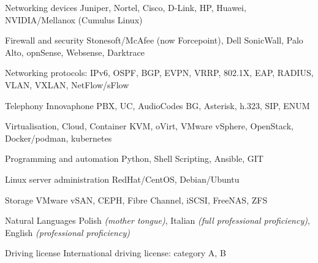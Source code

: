 


\begin{cvskills}


\cvskill
{Networking devices} %
{Juniper, Nortel, Cisco, D-Link, HP, Huawei, NVIDIA/Mellanox (Cumulus Linux)} %


\cvskill
{Firewall and security} %
{Stonesoft/McAfee (now Forcepoint), Dell SonicWall, Palo Alto, opnSense, Websense, Darktrace} %

\cvskill
{Networking protocols:} %
{IPv6, OSPF, BGP, EVPN, VRRP, 802.1X, EAP, RADIUS, VLAN, VXLAN, NetFlow/sFlow} %


\cvskill
{Telephony} %
{Innovaphone PBX, UC, AudioCodes BG, Asterisk, h.323, SIP, ENUM} %


\cvskill
{Virtualisation, Cloud, Container} %
{KVM, oVirt, VMware vSphere, OpenStack, Docker/podman, kubernetes} %

\cvskill
{Programming and automation} %
{Python, Shell Scripting, Ansible, GIT} %


\cvskill
{Linux server administration} %
{RedHat/CentOS, Debian/Ubuntu} %


\cvskill
{Storage} %
{VMware vSAN, CEPH, Fibre Channel, iSCSI, FreeNAS, ZFS} %

\cvskill
{Natural Languages} %
{Polish \textit{(mother tongue)}, Italian \textit{(full professional proficiency)}, English \textit{(professional proficiency)}} %


\cvskill
{Driving license} %
{International driving license: category A, B} %

\end{cvskills}
